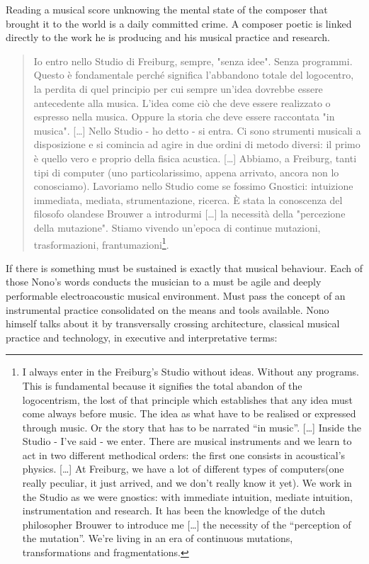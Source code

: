 \documentclass[twoside,a4paper]{article}
\begin{document}
Reading a musical score unknowing the mental state of the composer that brought it to the world is a daily committed crime. A composer poetic is linked directly to the work he is producing and his musical practice and research.

\begin{quote}
Io entro nello Studio di Freiburg, sempre, "senza idee". Senza programmi. Questo è fondamentale perché significa l'abbandono totale del logocentro, la perdita di quel principio per cui sempre un'idea dovrebbe essere antecedente alla musica. L'idea come ciò che deve essere realizzato o espresso nella musica. Oppure la storia che deve essere raccontata "in musica". [\ldots] Nello Studio - ho detto - si entra. Ci sono strumenti musicali a disposizione e si comincia ad agire in due ordini di metodo diversi: il primo è quello vero e proprio della fisica acustica. [\ldots] Abbiamo, a Freiburg, tanti tipi di computer (uno particolarissimo, appena arrivato, ancora non lo conosciamo). Lavoriamo nello Studio come se fossimo Gnostici: intuizione immediata, mediata, strumentazione, ricerca. È stata la conoscenza del filosofo olandese Brouwer a introdurmi [\ldots] la necessità della "percezione della mutazione". Stiamo vivendo un'epoca di continue mutazioni, trasformazioni, frantumazioni\cite{nono1}\footnote{I always enter in the Freiburg’s Studio without ideas. Without any programs. This is fundamental because it signifies the total abandon of the logocentrism, the lost of that principle which establishes that any idea must come always before music. The idea as what have to be realised or expressed through music. Or the story that has to be narrated “in music”. [\dots] Inside the Studio - I’ve said - we enter. There are musical instruments and we learn to act in two different methodical orders: the first one consists in acoustical’s physics. [\dots] At Freiburg, we have a lot of different types of computers(one really peculiar, it just arrived, and we don’t really know it yet). We work in the Studio as we were gnostics: with immediate intuition, mediate intuition, instrumentation and research. It has been the knowledge of the dutch philosopher Brouwer to introduce me [\dots] the necessity of the “perception of the mutation”. We’re living in an era of continuous mutations, transformations and fragmentations.}. 
\end{quote}

If there is something must be sustained is exactly that musical behaviour. Each of those Nono's words conducts the musician to a must be agile and deeply performable electroacoustic musical environment. Must pass the concept of an instrumental practice consolidated on the means and tools available. Nono himself talks about it by transversally crossing architecture, classical musical practice and technology, in executive and interpretative terms:
\end{document}
